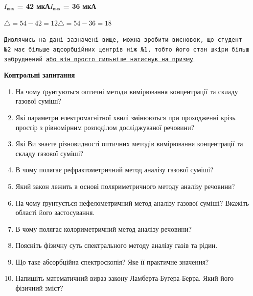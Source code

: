 \documentclass[a4paper,14pt]{extreport}
\begin{document}
\begin{tcolorbox}[colback=white!100,colframe=red!95!black,width=19cm,righttitle=0.5cm,subtitle style={boxrule=0.4pt, colback=yellow!50!red!25!white},title= \bf{\texttt{студент №1}}\hfill  \bf{\texttt{студент №2}}]
  \begin{center}\bf{$I_{\text{вих}}$ = 42 мкА}\hfill  \bf{$I_{\text{вих}}$ = 36 мкА}\end{center}
  \tcblower
  \bf{$\triangle = 54-42 = 12$}\hfill  \bf{$\triangle = 54-36 = 18$}
\end{tcolorbox}

\vspace{1cm}
\texttt{Дивлячись на  дані зазначені вище, можна зробити висновок, що студент №2 має більше адсорбційних центрів ніж №1, тобто його стан шкіри більш \\ забруднений \sout{або він просто сильніше натиснув на призму}}.










\newpage
\clearpage
\vspace{5cm}
\begin{center}
\textbf{Контрольні запитання}
\end{center}
\begin{enumerate}
\item На чому ґрунтуються оптичні методи вимірювання концентрації та складу
газової суміші?
\item  Які параметри електромагнітної хвилі змінюються при проходженні крізь
простір з рівномірним розподілом досліджуваної речовини?
\item  Які Ви знаєте різновидності оптичних методів вимірювання концентрації та
складу газової суміші?
\item  В чому полягає рефрактометричний метод аналізу газової суміші?
\item  Який закон лежить в основі поляриметричного методу аналізу речовини?
\item  На чому ґрунтується нефелометричний метод аналізу газової суміші?
Вкажіть області його застосування.
\item  В чому полягає колориметричний метод аналізу речовини?
\item  Поясніть фізичну суть спектрального методу аналізу газів та рідин.
\item  Що таке абсорбційна спектроскопія? Яке її практичне значення?
\item  Напишіть математичний вираз закону Ламберта-Бугера-Берра. Який його
фізичний зміст?
\end{enumerate}
\end{document}
